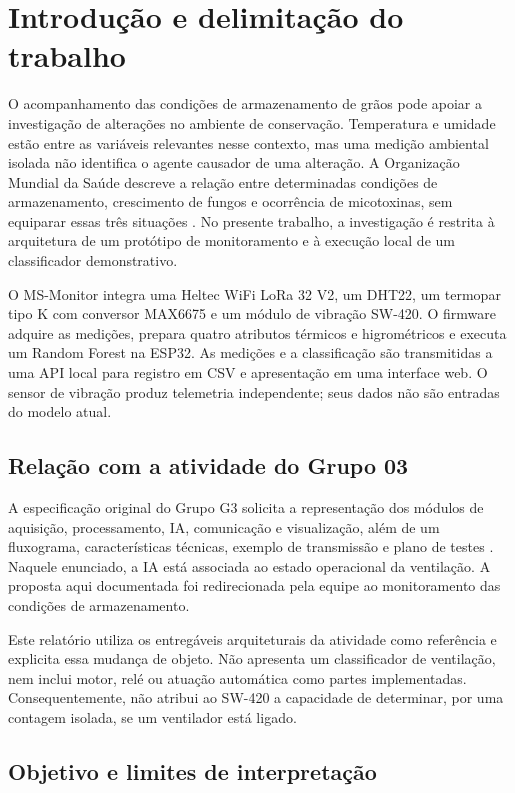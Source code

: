 \section{Introdução e delimitação do trabalho}
\label{sec:introducao}

O acompanhamento das condições de armazenamento de grãos pode apoiar a
investigação de alterações no ambiente de conservação. Temperatura e umidade
estão entre as variáveis relevantes nesse contexto, mas uma medição ambiental
isolada não identifica o agente causador de uma alteração. A Organização
Mundial da Saúde descreve a relação entre determinadas condições de
armazenamento, crescimento de fungos e ocorrência de micotoxinas, sem
equiparar essas três situações \cite{who2023}. No presente trabalho, a
investigação é restrita à arquitetura de um protótipo de monitoramento e à
execução local de um classificador demonstrativo.

O MS-Monitor integra uma Heltec WiFi LoRa 32 V2, um DHT22, um termopar tipo K
com conversor MAX6675 e um módulo de vibração SW-420. O firmware adquire as
medições, prepara quatro atributos térmicos e higrométricos e executa um
Random Forest na ESP32. As medições e a classificação são transmitidas a
uma API local para registro em CSV e apresentação em uma interface web.
O sensor de vibração produz telemetria independente; seus dados não são
entradas do modelo atual.

\subsection{Relação com a atividade do Grupo 03}

A especificação original do Grupo G3 solicita a representação dos módulos
de aquisição, processamento, IA, comunicação e visualização, além de um
fluxograma, características técnicas, exemplo de transmissão e plano de
testes \cite{freitas2026}. Naquele enunciado, a IA está associada ao estado
operacional da ventilação. A proposta aqui documentada foi redirecionada
pela equipe ao monitoramento das condições de armazenamento.

Este relatório utiliza os entregáveis arquiteturais da atividade como
referência e explicita essa mudança de objeto. Não apresenta um classificador
de ventilação, nem inclui motor, relé ou atuação automática como partes
implementadas. Consequentemente, não atribui ao SW-420 a capacidade de
determinar, por uma contagem isolada, se um ventilador está ligado.

\subsection{Objetivo e limites de interpretação}

